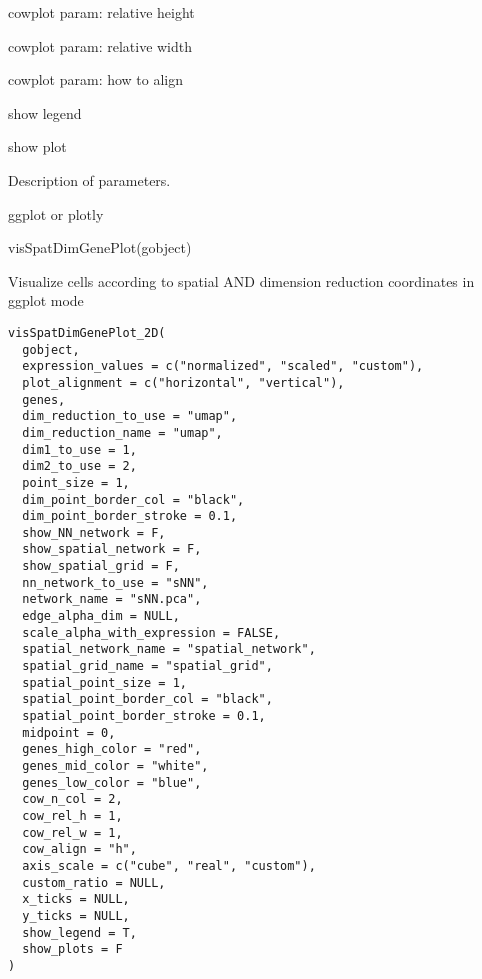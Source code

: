 \documentclass[a4paper]{book}
\begin{document}
\begin{Arguments}
\begin{ldescription}
\item[\code{cow\_rel\_h}] cowplot param: relative height

\item[\code{cow\_rel\_w}] cowplot param: relative width

\item[\code{cow\_align}] cowplot param: how to align

\item[\code{show\_legend}] show legend

\item[\code{show\_plot}] show plot
\end{ldescription}
\end{Arguments}
%
\begin{Details}\relax
Description of parameters.
\end{Details}
%
\begin{Value}
ggplot or plotly
\end{Value}
%
\begin{Examples}
\begin{ExampleCode}
    visSpatDimGenePlot(gobject)
\end{ExampleCode}
\end{Examples}
%
\begin{Description}\relax
Visualize cells according to spatial AND dimension reduction coordinates in ggplot mode
\end{Description}
%
\begin{Usage}
\begin{verbatim}
visSpatDimGenePlot_2D(
  gobject,
  expression_values = c("normalized", "scaled", "custom"),
  plot_alignment = c("horizontal", "vertical"),
  genes,
  dim_reduction_to_use = "umap",
  dim_reduction_name = "umap",
  dim1_to_use = 1,
  dim2_to_use = 2,
  point_size = 1,
  dim_point_border_col = "black",
  dim_point_border_stroke = 0.1,
  show_NN_network = F,
  show_spatial_network = F,
  show_spatial_grid = F,
  nn_network_to_use = "sNN",
  network_name = "sNN.pca",
  edge_alpha_dim = NULL,
  scale_alpha_with_expression = FALSE,
  spatial_network_name = "spatial_network",
  spatial_grid_name = "spatial_grid",
  spatial_point_size = 1,
  spatial_point_border_col = "black",
  spatial_point_border_stroke = 0.1,
  midpoint = 0,
  genes_high_color = "red",
  genes_mid_color = "white",
  genes_low_color = "blue",
  cow_n_col = 2,
  cow_rel_h = 1,
  cow_rel_w = 1,
  cow_align = "h",
  axis_scale = c("cube", "real", "custom"),
  custom_ratio = NULL,
  x_ticks = NULL,
  y_ticks = NULL,
  show_legend = T,
  show_plots = F
)
\end{verbatim}
\end{Usage}
\end{document}
